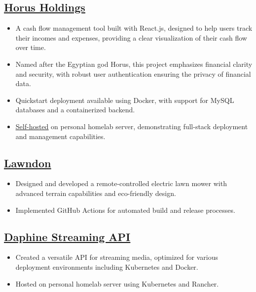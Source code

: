 \documentclass[a4paper,10pt]{article}
\begin{document}
\subsection*{\href{https://github.com/jordojordo/horus-holdings}{\underline{Horus Holdings}}}
\begin{itemize}[leftmargin=1.5em]
    \item A cash flow management tool built with React.js, designed to help users track their incomes and expenses, providing a clear visualization of their cash flow over time.
    \item Named after the Egyptian god Horus, this project emphasizes financial clarity and security, with robust user authentication ensuring the privacy of financial data.
    \item Quickstart deployment available using Docker, with support for MySQL databases and a containerized backend.
    \item \href{https://horus.yokanga.xyz}{\underline{Self-hosted}} on personal homelab server, demonstrating full-stack deployment and management capabilities.
\end{itemize}

\subsection*{\href{https://github.com/jordojordo/lawndon-lite}{\underline{Lawndon}}}
\begin{itemize}[leftmargin=1.5em]
    \item Designed and developed a remote-controlled electric lawn mower with advanced terrain capabilities and eco-friendly design.
    \item Implemented GitHub Actions for automated build and release processes.
\end{itemize}

\subsection*{\href{https://github.com/jordojordo/daphine}{\underline{Daphine Streaming API}}}
\begin{itemize}[leftmargin=1.5em]
    \item Created a versatile API for streaming media, optimized for various deployment environments including Kubernetes and Docker.
    \item Hosted on personal homelab server using Kubernetes and Rancher.
\end{itemize}
\end{document}
